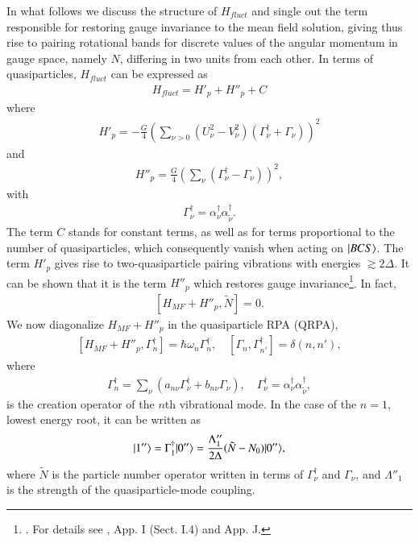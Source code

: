 In what follows we  discuss the structure of $H_{fluct}$ and single out the term responsible for restoring gauge invariance to the  mean field solution, giving thus rise to pairing rotational bands for discrete values of the angular momentum in gauge space, namely $N$, differing in two units from each other. In terms of quasiparticles, $H_{fluct}$ can be expressed  as
\begin{align}\label{eq0.1.91}
H_{fluct}=H'_p+H''_p+C
\end{align}
where 
\begin{align}\label{eq0.1.92}
H'_p=-\frac{G}{4}\left(\sum_{\nu>0}\left(U^2_\nu-V^2_\nu\right)\left(\Gamma^\dagger_\nu+\Gamma_\nu\right)\right)^2
\end{align}
and
\begin{align}\label{eq0.1.93}
H''_p=\frac{G}{4}\left(\sum_{\nu}\left(\Gamma^\dagger_\nu-\Gamma_\nu\right)\right)^2,
\end{align}
with
\begin{align}\label{eq0.1.94}
\Gamma^\dagger_\nu=\alpha^\dagger_\nu\alpha_{\tilde \nu}^\dagger.
\end{align}
The term $C$ stands for constant terms, as well as for terms proportional to the number of quasiparticles, which consequently vanish when acting on $|{BCS} \rangle$. The term $H'_p$ gives rise to two-quasiparticle pairing vibrations with energies $\gtrsim2\Delta$. It can be shown that it is the term $H''_p$ which restores gauge invariance\footnote{\cite{Hogassen:61,Bes:66}. For details see \cite{Brink:05}, App. I (Sect. I.4) and App. J.}. In fact,
\begin{align}\label{eq0.1.95}
\left[H_{MF}+H''_p,\tilde N\right]=0.
\end{align}
We now diagonalize $H_{MF}+H''_p$ in the quasiparticle RPA (QRPA),
\begin{align}\label{eq0.1.96}
\left[H_{MF}+H''_p,\Gamma^\dagger_n\right]=\hbar\omega_n\Gamma^\dagger_n,\quad \left[\Gamma_n,\Gamma^\dagger_{n'}\right]=\delta(n,n'),
\end{align}
where
\begin{align}\label{eq0.1.97}
\Gamma^\dagger_n=\sum_{\nu}\left(a_{n\nu}\Gamma^\dagger_\nu+b_{n\nu}\Gamma_\nu\right),\quad \Gamma^\dagger_\nu=\alpha^\dagger_\nu\alpha^\dagger_{\tilde\nu},	
\end{align}
is the creation operator of the $n$th vibrational mode. In the case of the $n=1$, lowest energy root, it can be written as
\begin{align}\label{eq0.1.98}
|{1''} \rangle=\Gamma^\dagger_1|{0''} \rangle=\frac{\Lambda''_1}{2\Delta}(\tilde N-N_0)|{0''} \rangle,	
\end{align}
where $\tilde N$ is the particle number operator written in terms of $\Gamma^\dagger_\nu$ and $\Gamma_\nu$, and $\Lambda''_1$ is the strength of the quasiparticle-mode coupling. 

